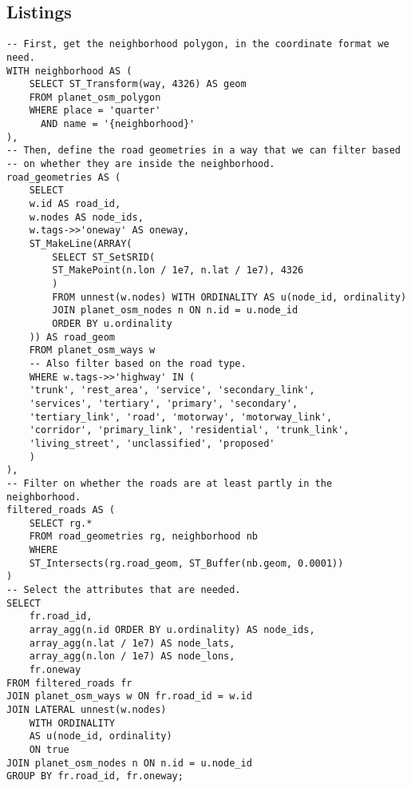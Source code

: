\subsection{Listings}
\begin{lstlisting}[caption={The query to extract roads inside a neighborhood.}, label={lst:sql-roads}]
-- First, get the neighborhood polygon, in the coordinate format we need.
WITH neighborhood AS (
    SELECT ST_Transform(way, 4326) AS geom
    FROM planet_osm_polygon
    WHERE place = 'quarter'
      AND name = '{neighborhood}'
),
-- Then, define the road geometries in a way that we can filter based 
-- on whether they are inside the neighborhood.
road_geometries AS (
    SELECT
	w.id AS road_id,
	w.nodes AS node_ids,
	w.tags->>'oneway' AS oneway,
	ST_MakeLine(ARRAY(
	    SELECT ST_SetSRID(
		ST_MakePoint(n.lon / 1e7, n.lat / 1e7), 4326
		)
	    FROM unnest(w.nodes) WITH ORDINALITY AS u(node_id, ordinality)
	    JOIN planet_osm_nodes n ON n.id = u.node_id
	    ORDER BY u.ordinality
	)) AS road_geom
    FROM planet_osm_ways w
    -- Also filter based on the road type.
    WHERE w.tags->>'highway' IN (
	'trunk', 'rest_area', 'service', 'secondary_link',
	'services', 'tertiary', 'primary', 'secondary',
	'tertiary_link', 'road', 'motorway', 'motorway_link', 
	'corridor', 'primary_link', 'residential', 'trunk_link', 
	'living_street', 'unclassified', 'proposed'
    )
),
-- Filter on whether the roads are at least partly in the neighborhood.
filtered_roads AS (
    SELECT rg.*
    FROM road_geometries rg, neighborhood nb
    WHERE
	ST_Intersects(rg.road_geom, ST_Buffer(nb.geom, 0.0001))
)
-- Select the attributes that are needed.
SELECT
    fr.road_id,
    array_agg(n.id ORDER BY u.ordinality) AS node_ids,
    array_agg(n.lat / 1e7) AS node_lats,
    array_agg(n.lon / 1e7) AS node_lons,
    fr.oneway
FROM filtered_roads fr
JOIN planet_osm_ways w ON fr.road_id = w.id
JOIN LATERAL unnest(w.nodes) 
    WITH ORDINALITY 
    AS u(node_id, ordinality) 
    ON true
JOIN planet_osm_nodes n ON n.id = u.node_id
GROUP BY fr.road_id, fr.oneway;
\end{lstlisting}
